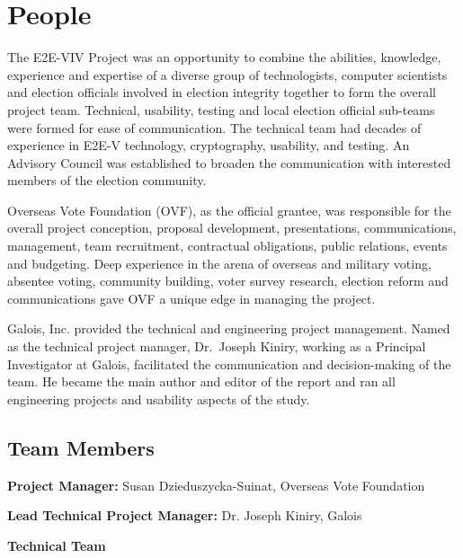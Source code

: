 \section{People}
\label{sec:people}

The E2E-VIV Project was an opportunity to combine the abilities,
knowledge, experience and expertise of a diverse group of
technologists, computer scientists and election officials involved in
election integrity together to form the overall project
team. Technical, usability, testing and local election official
sub-teams were formed for ease of communication. The technical team
had decades of experience in E2E-V technology, cryptography, usability,
and testing. An Advisory Council was established to broaden the
communication with interested members of the election community.

Overseas Vote Foundation (OVF), as the official grantee, was
responsible for the overall project conception, proposal development,
presentations, communications, management, team recruitment,
contractual obligations, public relations, events and budgeting. Deep
experience in the arena of overseas and military voting, absentee
voting, community building, voter survey research, election reform and
communications gave OVF a unique edge in managing the project.

Galois, Inc. provided the technical and engineering project
management. Named as the technical project manager, Dr.~Joseph Kiniry,
working as a Principal Investigator at Galois, facilitated the
communication and decision-making of the team. He became the main
author and editor of the report and ran all engineering projects and
usability aspects of the study.

\subsection{Team Members}
\label{sec:team-members}

\textbf{Project Manager:} Susan Dzieduszycka-Suinat, Overseas Vote Foundation

\textbf{Lead Technical Project Manager:} Dr. Joseph Kiniry, Galois

\textbf{Technical Team}

